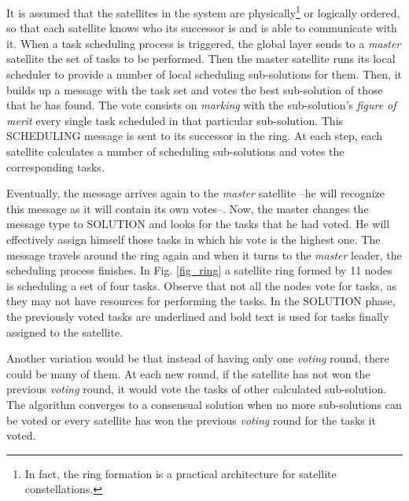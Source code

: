 It is assumed that the satellites in the system are physically\footnote{In fact, the ring formation is a practical architecture for satellite constellations.} or logically ordered, so that each satellite knows who its successor is and is able to communicate with it. When a task scheduling process is triggered, the global layer sends to a \emph{master} satellite the set of tasks to be performed. Then the master satellite runs its local scheduler to provide a number of local scheduling sub-solutions for them. Then, it builds up a message with the task set and votes the best sub-solution of those that he has found. The vote consists on \emph{marking} with the sub-solution's \emph{figure of merit} every single task scheduled in that particular sub-solution. This SCHEDULING message is sent to its successor in the ring. At each step, each satellite calculates a number of scheduling sub-solutions and votes the corresponding tasks.

Eventually, the message arrives again to the \emph{master} satellite --he will recognize this message as it will contain its own votes--. Now, the master changes the message type to SOLUTION and looks for the tasks that he had voted. He will effectively assign himself those tasks in which his vote is the highest one. The message travels around the ring again and when it turns to the \emph{master} leader, the scheduling process finishes. In Fig. \ref{fig_ring} a satellite ring formed by 11 nodes is scheduling a set of four tasks. Observe that not all the nodes vote for tasks, as they may not have resources for performing the tasks. In the SOLUTION phase, the previously voted tasks are underlined and bold text is used for tasks finally assigned to the satellite. 

Another variation would be that instead of having only one \emph{voting} round, there could be many of them. At each new round, if the satellite has not won the previous \emph{voting} round, it would vote the tasks of other calculated sub-solution. The algorithm converges to a consensual solution when no more sub-solutions can be voted or every satellite has won the previous \emph{voting} round for the tasks it voted.
